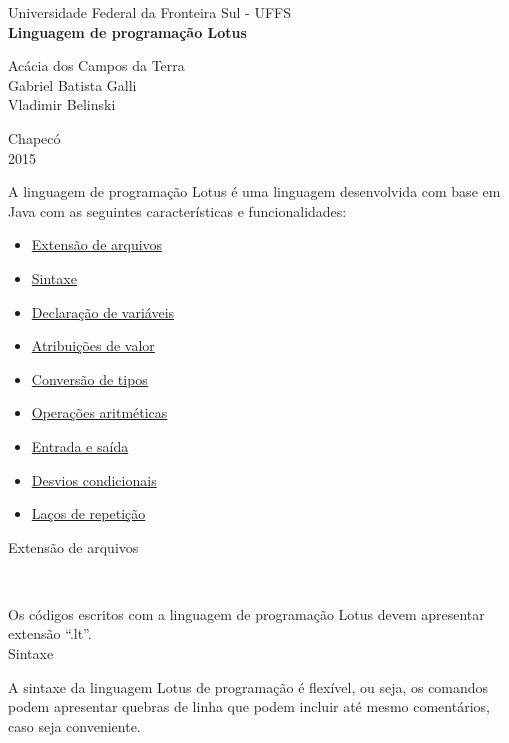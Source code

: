 \documentclass[12pt,a4paper]{article}
\begin{document}
\begin{titlepage}
\begin{center}
{\large Universidade Federal da Fronteira Sul - UFFS}\\[5.5cm]
{\bf \huge Linguagem de programação Lotus}\\[4.9cm]
\end{center}
{\large Acácia dos Campos da Terra}\\
{\large Gabriel Batista Galli}\\
{\large Vladimir Belinski}\\[5.8cm]
\begin{center}
{\large Chapecó}\\[0.1cm]
{\large 2015}
\end{center}
\end{titlepage}

A linguagem de programação Lotus é uma linguagem desenvolvida com base em Java com as seguintes características e funcionalidades:\\

\begin{itemize}
\item \hyperlink{label7}{Extensão de arquivos}
\item \hyperlink{label6}{Sintaxe}
\item \hyperlink{label}{Declaração de variáveis}
\item \hyperlink{label2}{Atribuições de valor}
\item \hyperlink{label8}{Conversão de tipos}
\item \hyperlink{label3}{Operações aritméticas}
\item \hyperlink{label1}{Entrada e saída}
\item \hyperlink{label4}{Desvios condicionais}
\item \hyperlink{label5}{Laços de repetição}\\[15.4cm]
\end{itemize}

\hypertarget{label7}{\Large{Extensão de arquivos}}\\[0.3cm]
\normalsize

Os códigos escritos com a linguagem de programação Lotus devem apresentar extensão ``.lt''.\\

\hypertarget{label6}{\Large{Sintaxe}}\\[0.3cm]
\normalsize

A sintaxe da linguagem Lotus de programação é flexível, ou seja, os comandos podem apresentar quebras de linha que podem incluir até mesmo comentários, caso seja conveniente. \\
\end{document}
